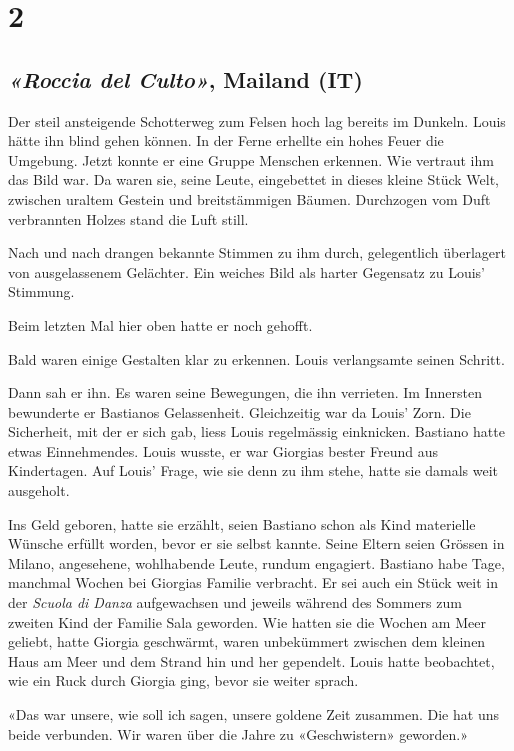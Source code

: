 \chapter{2}

\section[«Roccia del Culto», Mailand (IT)]{\emph{«Roccia del Culto»}, Mailand (IT)}


Der steil ansteigende Schotterweg zum Felsen hoch lag bereits im Dunkeln. Louis hätte ihn blind gehen können. 
In der Ferne erhellte ein hohes Feuer die Umgebung. Jetzt konnte er eine Gruppe Menschen erkennen. 
Wie vertraut ihm das Bild war. 
Da waren sie, seine Leute, eingebettet in dieses kleine Stück Welt, zwischen
uraltem Gestein und breitstämmigen Bäumen. Durchzogen vom Duft verbrannten Holzes stand die Luft still. 

Nach und nach drangen bekannte Stimmen zu ihm durch, gelegentlich
überlagert von ausgelassenem Gelächter. Ein weiches Bild als harter
Gegensatz zu Louis’ Stimmung.

Beim letzten Mal hier oben hatte er noch gehofft.

Bald waren einige Gestalten klar zu erkennen. Louis verlangsamte seinen
Schritt.

Dann sah er ihn. Es waren seine Bewegungen, die ihn verrieten. 
Im Innersten bewunderte er Bastianos Gelassenheit. Gleichzeitig war da
Louis’ Zorn. Die Sicherheit, mit der er sich gab, liess Louis regelmässig 
einknicken. Bastiano hatte etwas Einnehmendes. Louis wusste, er war
Giorgias bester Freund aus Kindertagen.
Auf Louis’ Frage, wie sie denn zu ihm stehe, hatte sie damals weit
ausgeholt.

Ins Geld geboren, hatte sie erzählt, seien Bastiano schon als Kind
materielle Wünsche erfüllt worden, bevor er sie selbst kannte. Seine Eltern seien 
Grössen in Milano, angesehene, wohlhabende Leute, rundum engagiert.
Bastiano habe Tage, manchmal Wochen bei Giorgias Familie verbracht. Er
sei auch ein Stück weit in der \emph{Scuola di Danza} aufgewachsen  
und jeweils während des Sommers zum zweiten Kind der Familie Sala geworden.
Wie hatten sie die Wochen am Meer geliebt, hatte Giorgia
geschwärmt, waren unbekümmert zwischen dem kleinen Haus am Meer
und dem Strand hin und her gependelt.
Louis hatte beobachtet, wie ein Ruck durch Giorgia ging, bevor sie weiter sprach.

«Das war unsere, wie soll ich sagen, unsere goldene Zeit zusammen. Die
hat uns beide verbunden. Wir waren über die Jahre zu 
«Geschwistern» geworden.»

